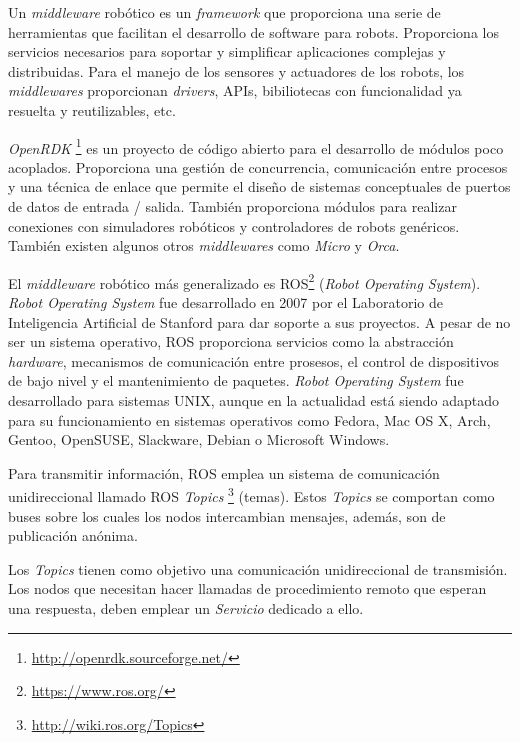 \documentclass[a4paper, 12pt]{book}
\begin{document}

Un \textit{middleware} robótico es un \textit{framework} que proporciona una serie de herramientas que facilitan el desarrollo de software para robots. Proporciona los servicios necesarios para soportar y simplificar aplicaciones complejas y distribuidas. Para el manejo de los sensores y actuadores de los robots, los \textit{middlewares} proporcionan \textit{drivers}, APIs, bibiliotecas con funcionalidad ya resuelta y reutilizables, etc.

\emph{OpenRDK} \footnote{\url{http://openrdk.sourceforge.net/}} es un proyecto de código abierto para el desarrollo de módulos poco acoplados. Proporciona una gestión de concurrencia, comunicación entre procesos y una técnica de enlace que permite el diseño de sistemas conceptuales de puertos de datos de entrada / salida. También proporciona módulos para realizar conexiones con simuladores robóticos y controladores de robots genéricos. También existen algunos otros \emph{middlewares} como \emph{Micro} y \emph{Orca}.

El \textit{middleware} robótico más generalizado es ROS\footnote{\url{https://www.ros.org/}}
 (\textit{Robot Operating System}). \textit{Robot Operating System} fue desarrollado en 2007 por el Laboratorio de Inteligencia Artificial de Stanford para dar soporte a sus proyectos. A pesar de no ser un sistema operativo, ROS proporciona servicios como la abstracción \textit{hardware}, mecanismos de comunicación entre prosesos, el control de dispositivos de bajo nivel y el mantenimiento de paquetes. \textit{Robot Operating System} fue desarrollado para sistemas UNIX, aunque en la actualidad está siendo adaptado para su funcionamiento en sistemas operativos como Fedora, Mac OS X, Arch, Gentoo, OpenSUSE, Slackware, Debian o Microsoft Windows.
 
Para transmitir información, ROS emplea un sistema de comunicación unidireccional llamado ROS \emph{Topics} \footnote{\url{http://wiki.ros.org/Topics}} (temas). Estos \emph{Topics} se comportan como buses sobre los cuales los nodos intercambian mensajes, además, son de publicación anónima.

Los \emph{Topics} tienen como objetivo una comunicación unidireccional de transmisión. Los nodos que necesitan hacer llamadas de procedimiento remoto que esperan una respuesta, deben emplear un \emph{Servicio} dedicado a ello.
\end{document}
